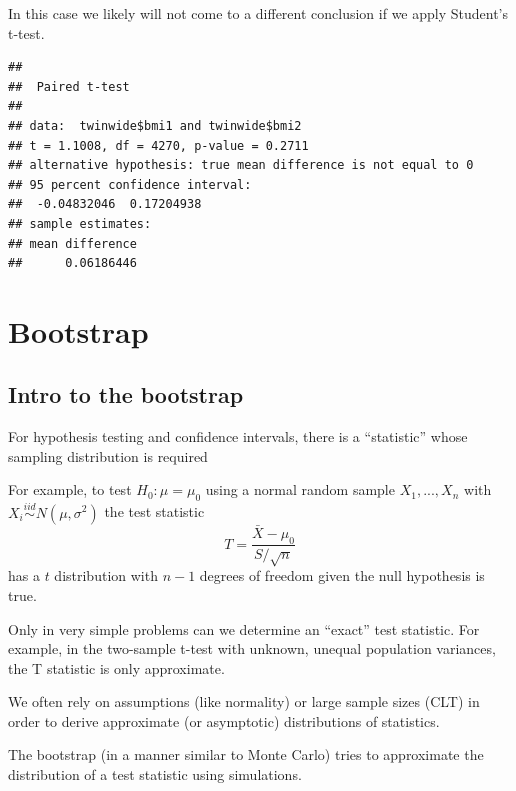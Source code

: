 \documentclass[
]{book}
\newenvironment{Shaded}{\begin{snugshade}}{\end{snugshade}}
\newcommand{\AttributeTok}[1]{\textcolor[rgb]{0.77,0.63,0.00}{#1}}
\newcommand{\ConstantTok}[1]{\textcolor[rgb]{0.00,0.00,0.00}{#1}}
\newcommand{\FunctionTok}[1]{\textcolor[rgb]{0.00,0.00,0.00}{#1}}
\newcommand{\NormalTok}[1]{#1}
\newcommand{\SpecialCharTok}[1]{\textcolor[rgb]{0.00,0.00,0.00}{#1}}
\begin{document}
In this case we likely will not come to a different conclusion if we apply Student's t-test.

\begin{Shaded}
\end{Shaded}

\begin{verbatim}
## 
##  Paired t-test
## 
## data:  twinwide$bmi1 and twinwide$bmi2
## t = 1.1008, df = 4270, p-value = 0.2711
## alternative hypothesis: true mean difference is not equal to 0
## 95 percent confidence interval:
##  -0.04832046  0.17204938
## sample estimates:
## mean difference 
##      0.06186446
\end{verbatim}

\hypertarget{bootstrap}{%
\section{Bootstrap}\label{bootstrap}}

\hypertarget{intro-to-the-bootstrap}{%
\subsection{Intro to the bootstrap}\label{intro-to-the-bootstrap}}

For hypothesis testing and confidence intervals, there is a ``statistic'' whose sampling distribution is required

For example, to test \(H_0:\mu = \mu_0\) using a normal random sample \(X_1, ..., X_n\) with \(X_i \stackrel{iid}{\sim}N(\mu, \sigma^2)\) the test statistic
\[T = \frac{\bar X - \mu_0}{S/\sqrt{n}}\]
has a \(t\) distribution with \(n-1\) degrees of freedom given the null hypothesis is true.

Only in very simple problems can we determine an ``exact'' test statistic. For example, in the two-sample t-test with unknown, unequal population variances, the T statistic is only approximate.

We often rely on assumptions (like normality) or large sample sizes (CLT) in order to derive approximate (or asymptotic) distributions of statistics.

The bootstrap (in a manner similar to Monte Carlo) tries to approximate the distribution of a test statistic using simulations.
\end{document}
